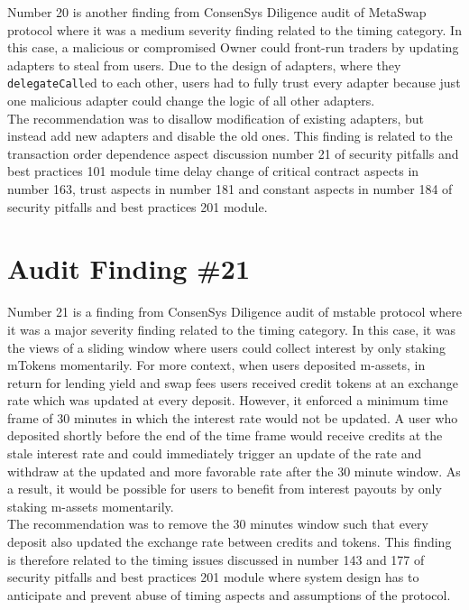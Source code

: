 Number 20 is another finding from ConsenSys Diligence audit of MetaSwap protocol where it was a medium severity finding related to the timing category. In this case, a malicious or compromised Owner could front-run traders by updating adapters to steal from users. Due to the design of adapters, where they \verb|delegateCall|ed to each other, users had to fully trust every adapter because just one malicious adapter could change the logic of all other adapters.\\

The recommendation was to disallow modification of existing adapters, but instead add new adapters and disable the old ones. This finding is related to the transaction order dependence aspect discussion number 21 of security pitfalls and best practices 101 module time delay change of critical contract aspects in number 163, trust aspects in number 181 and constant aspects in number 184 of security pitfalls and best practices 201 module.

\section{Audit Finding \#21}

Number 21 is a finding from ConsenSys Diligence audit of mstable protocol where it was a major severity finding related to the timing category. In this case, it was the views of a sliding window where users could collect interest by only staking mTokens momentarily. For more context, when users deposited  m-assets, in return for lending yield and swap fees users received credit tokens at an exchange rate which was updated at every deposit. However, it enforced a minimum time frame of 30 minutes in which the interest rate would not be updated. A user who deposited shortly before the end of the time frame would receive credits at the stale interest rate and could immediately trigger an update of the rate and withdraw at the updated and more favorable rate after the 30 minute window. As a result, it would be possible for users to benefit from interest payouts by only staking m-assets momentarily.\\

The recommendation was to remove the 30 minutes window such that every deposit also updated the exchange rate between credits and tokens. This finding is therefore related to the timing issues discussed in number 143 and 177 of security pitfalls and best practices 201 module where system design has to anticipate and prevent abuse of timing aspects and assumptions of the protocol.

